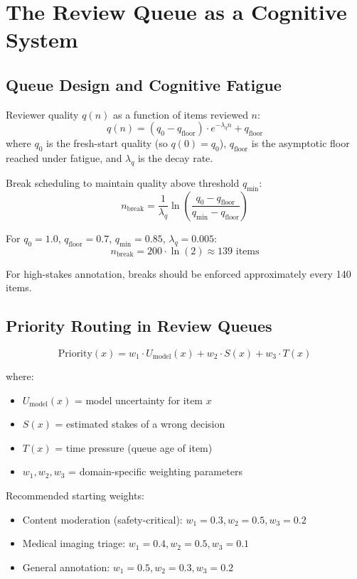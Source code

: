 \section{The Review Queue as a Cognitive System}

\subsection{Queue Design and Cognitive Fatigue}

Reviewer quality $q(n)$ as a function of items reviewed $n$:
\[
q(n) = (q_0 - q_{\text{floor}}) \cdot e^{-\lambda_q n} + q_{\text{floor}}
\]
where $q_0$ is the fresh-start quality (so $q(0) = q_0$), $q_{\text{floor}}$ is the asymptotic floor reached under fatigue, and $\lambda_q$ is the decay rate.

Break scheduling to maintain quality above threshold $q_{\min}$:
\[
n_{\text{break}} = \frac{1}{\lambda_q} \ln\!\left(\frac{q_0 - q_{\text{floor}}}{q_{\min} - q_{\text{floor}}}\right)
\]

For $q_0 = 1.0$, $q_{\text{floor}} = 0.7$, $q_{\min} = 0.85$, $\lambda_q = 0.005$:
\[
n_{\text{break}} = 200 \cdot \ln(2) \approx 139 \text{ items}
\]

For high-stakes annotation, breaks should be enforced approximately every 140 items.

\subsection{Priority Routing in Review Queues}

\[
\text{Priority}(x) = w_1 \cdot U_{\text{model}}(x) + w_2 \cdot S(x) + w_3 \cdot T(x)
\]

where:
\begin{itemize}
    \item $U_{\text{model}}(x)$ = model uncertainty for item $x$
    \item $S(x)$ = estimated stakes of a wrong decision
    \item $T(x)$ = time pressure (queue age of item)
    \item $w_1, w_2, w_3$ = domain-specific weighting parameters
\end{itemize}

Recommended starting weights:
\begin{itemize}
    \item Content moderation (safety-critical): $w_1 = 0.3, w_2 = 0.5, w_3 = 0.2$
    \item Medical imaging triage: $w_1 = 0.4, w_2 = 0.5, w_3 = 0.1$
    \item General annotation: $w_1 = 0.5, w_2 = 0.3, w_3 = 0.2$
\end{itemize}

